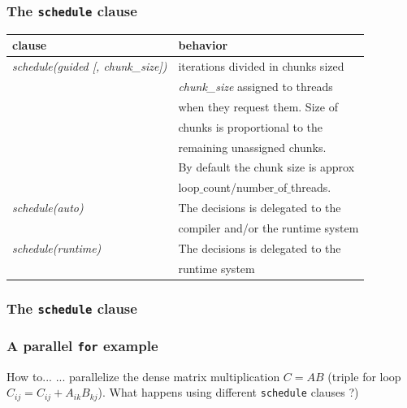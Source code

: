 \begin{frame}[containsverbatim]
\frametitle{The \texttt{schedule} clause}

\begin{center}
\begin{tabular}{|l|l|}
\hline
  \textbf{clause} & \textbf{behavior}  \\
\hline
\hline
\textit{schedule(guided [, chunk\_size])}  &
iterations divided in chunks sized \\
& \textit{chunk\_size} assigned to threads \\
& when they request them. Size of  \\
& chunks is proportional to the  \\
& remaining unassigned chunks. \\
& By default the chunk size is approx \\
& loop$\_$count/number$\_$of$\_$threads. \\



\hline
\textit{schedule(auto)}  &
The decisions is delegated to the \\
 & compiler and/or the runtime system \\

\hline
\textit{schedule(runtime)}  &
The decisions is delegated to the \\
 & runtime system \\


\hline
\end{tabular}
\end{center}

\end{frame}


\begin{frame}
\frametitle{The \texttt{schedule} clause}
\begin{center}
{}
\end{center}
\end{frame}


\begin{frame}[containsverbatim]
\frametitle{A parallel \texttt{for} example}


\begin{block}{How to...}
... parallelize the dense matrix multiplication $C = A B$ (triple for loop $C_{ij} = C_{ij} + A_{ik} B_{kj}$). What happens using different \texttt{schedule} clauses ?)
\end{block}

\end{frame}


